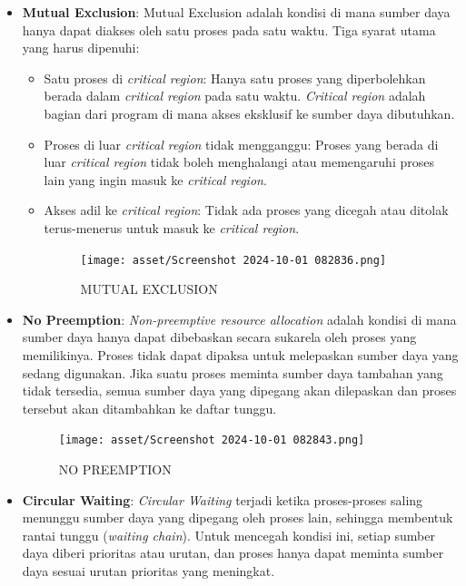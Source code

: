 \documentclass[12pt]{article}
\begin{document}
\begin{itemize}
\begin{itemize}
    \item \textbf{Mutual Exclusion}:
    Mutual Exclusion adalah kondisi di mana sumber daya hanya dapat diakses oleh satu proses pada satu waktu. Tiga syarat utama yang harus dipenuhi:
    \begin{itemize}
        \item Satu proses di \textit{critical region}: Hanya satu proses yang diperbolehkan berada dalam \textit{critical region} pada satu waktu. \textit{Critical region} adalah bagian dari program di mana akses eksklusif ke sumber daya dibutuhkan.
        \item Proses di luar \textit{critical region} tidak mengganggu: Proses yang berada di luar \textit{critical region} tidak boleh menghalangi atau memengaruhi proses lain yang ingin masuk ke \textit{critical region}.
        \item Akses adil ke \textit{critical region}: Tidak ada proses yang dicegah atau ditolak terus-menerus untuk masuk ke \textit{critical region}.
          \begin{figure}[htbp]
    \centering
    \texttt{[image: asset/Screenshot 2024-10-01 082836.png]}
    \caption{MUTUAL EXCLUSION}
    \label{fig:enter-label}
    \end{figure}
    \end{itemize}
    
    \item \textbf{No Preemption}:
    \textit{Non-preemptive resource allocation} adalah kondisi di mana sumber daya hanya dapat dibebaskan secara sukarela oleh proses yang memilikinya. Proses tidak dapat dipaksa untuk melepaskan sumber daya yang sedang digunakan. Jika suatu proses meminta sumber daya tambahan yang tidak tersedia, semua sumber daya yang dipegang akan dilepaskan dan proses tersebut akan ditambahkan ke daftar tunggu.

    \begin{figure}
        \centering
        \texttt{[image: asset/Screenshot 2024-10-01 082843.png]}
        \caption{NO PREEMPTION}
        \label{fig:enter-label}
    \end{figure}

    \item \textbf{Circular Waiting}:
    \textit{Circular Waiting} terjadi ketika proses-proses saling menunggu sumber daya yang dipegang oleh proses lain, sehingga membentuk rantai tunggu (\textit{waiting chain}). Untuk mencegah kondisi ini, setiap sumber daya diberi prioritas atau urutan, dan proses hanya dapat meminta sumber daya sesuai urutan prioritas yang meningkat.


\end{itemize}
\end{itemize}
\end{document}
